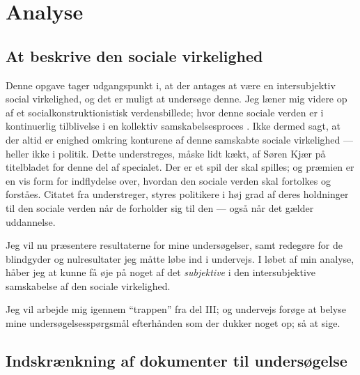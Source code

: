 \renewcommand*{\afterpartskip}{
\vfil
\begin{epigraphs}
\qitem{\itshape
“Jo, hvis dét skal kaldes Fakta, saa benægter a Fakta!”
}{folketingsmedlem Søren Kjær, i debat med Carl Steen Andersen Bille}
\qitem{\itshape
  Politik skal ikke videnskabeliggøres. Der findes ikke noget facit i politik – kun følelser og holdninger. Begreber som sandt og falsk eller godt og ondt har ganske enkelt ikke hjemme i det politiske rum. 
}{Peter Skaarup, i et ugebrev for Dansk Folkeparti, \citeyear{skaarupPolitikErForst2017}}
\end{epigraphs}}

\part{Analyse}\label{part:analysis}

\chapter{At beskrive den sociale virkelighed}


Denne opgave tager udgangspunkt i, at der antages at være en intersubjektiv social virkelighed, og det er muligt at undersøge denne.
Jeg læner mig videre op af et socialkonstruktionistisk verdensbillede; hvor denne sociale verden er i kontinuerlig tilblivelse i en kollektiv samskabelsesproces .
Ikke dermed sagt, at der altid er enighed omkring konturene af denne samskabte sociale virkelighed — heller ikke i politik.
Dette understreges, måske lidt kækt, af Søren Kjær på titelbladet for denne del af specialet.
Der er et spil der skal spilles; og præmien er en vis form for indflydelse over, hvordan den sociale verden skal fortolkes og forståes.
Citatet fra  understreger, styres politikere i høj grad af deres holdninger til den sociale verden når de forholder sig til den — også når det gælder uddannelse.

Jeg vil nu præsentere resultaterne for mine undersøgelser, samt redegøre for de blindgyder og nulresultater jeg måtte løbe ind i undervejs.
I løbet af min analyse, håber jeg at kunne få øje på noget af det \textit{subjektive} i den intersubjektive samskabelse af den sociale virkelighed.

Jeg vil arbejde mig igennem “trappen” fra del III; og undervejs forøge at belyse mine undersøgelsesspørgsmål efterhånden som der dukker noget op; så at sige.

\chapter{Indskrænkning af dokumenter til undersøgelse}

